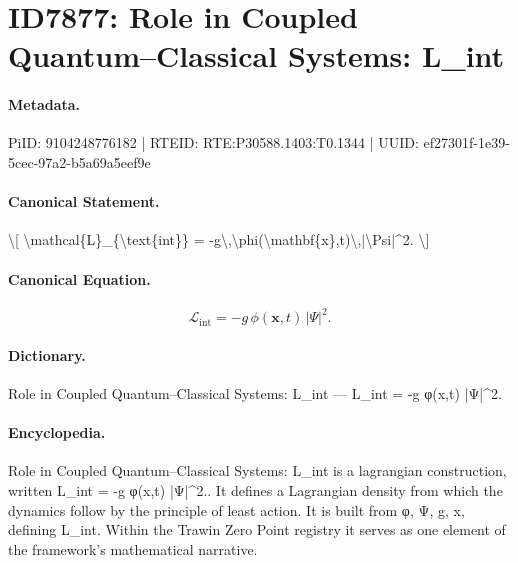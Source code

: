 \section*{ID7877: Role in Coupled Quantum–Classical Systems: L\_int}
\paragraph{Metadata.}
PiID: 9104248776182 | RTEID: RTE:P30588.1403:T0.1344 | UUID: ef27301f-1e39-5cec-97a2-b5a69a5eef9e

\paragraph{Canonical Statement.}
\textbackslash{}[ \textbackslash{}mathcal\{L\}\_\{\textbackslash{}text\{int\}\} = -g\textbackslash{},\textbackslash{}phi(\textbackslash{}mathbf\{x\},t)\textbackslash{},|\textbackslash{}Psi|\textasciicircum{}2. \textbackslash{}]

\paragraph{Canonical Equation.}
\[
\mathcal{L}_{\text{int}} = -g\,\phi(\mathbf{x},t)\,|\Psi|^2.
\]

\paragraph{Dictionary.}
Role in Coupled Quantum–Classical Systems: L\_int — L\_int = -g φ(x,t) |Ψ|\textasciicircum{}2.

\paragraph{Encyclopedia.}
Role in Coupled Quantum–Classical Systems: L\_int is a lagrangian construction, written L\_int = -g φ(x,t) |Ψ|\textasciicircum{}2.. It defines a Lagrangian density from which the dynamics follow by the principle of least action. It is built from φ, Ψ, g, x, defining L\_int. Within the Trawin Zero Point registry it serves as one element of the framework's mathematical narrative.
